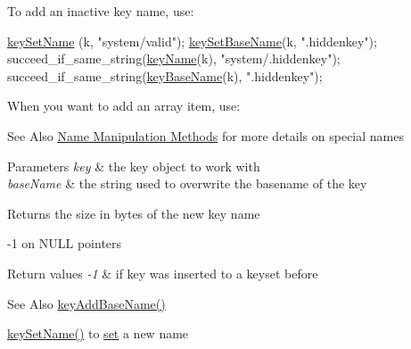 To add an inactive key name, use\-: 
\begin{DoxyCodeInclude}
        \hyperlink{group__keyname_ga7699091610e7f3f43d2949514a4b35d9}{keySetName} (k, \textcolor{stringliteral}{"system/valid"});
        \hyperlink{group__keyname_ga6e804bd453f98c28b0ff51430d1df407}{keySetBaseName}(k, \textcolor{stringliteral}{".hiddenkey"});
        succeed\_if\_same\_string(\hyperlink{group__keyname_ga8e805c726a60da921d3736cda7813513}{keyName}(k), \textcolor{stringliteral}{"system/.hiddenkey"});
        succeed\_if\_same\_string(\hyperlink{group__keyname_gaaff35e7ca8af5560c47e662ceb9465f5}{keyBaseName}(k), \textcolor{stringliteral}{".hiddenkey"});
\end{DoxyCodeInclude}
 When you want to add an array item, use\-: 
 \begin{DoxySeeAlso}{See Also}
\hyperlink{group__keyname}{Name Manipulation Methods} for more details on special names
\end{DoxySeeAlso}

\begin{DoxyParams}{Parameters}
{\em key} & the key object to work with \\
\hline
{\em base\-Name} & the string used to overwrite the basename of the key \\
\hline
\end{DoxyParams}
\begin{DoxyReturn}{Returns}
the size in bytes of the new key name 

-\/1 on N\-U\-L\-L pointers 
\end{DoxyReturn}

\begin{DoxyRetVals}{Return values}
{\em -\/1} & if key was inserted to a keyset before \\
\hline
\end{DoxyRetVals}
\begin{DoxySeeAlso}{See Also}
\hyperlink{group__keyname_gaa942091fc4bd5c2699e49ddc50829524}{key\-Add\-Base\-Name()} 

\hyperlink{group__keyname_ga7699091610e7f3f43d2949514a4b35d9}{key\-Set\-Name()} to \hyperlink{classkdb_1_1Key_a615124f0a2b291e03975b49c233654d7}{set} a new name 
\end{DoxySeeAlso}



